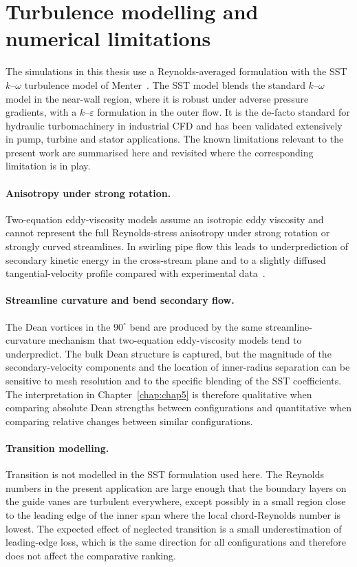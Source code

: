 \section{Turbulence modelling and numerical limitations}
\label{sec:theory_turbulence}
 
The simulations in this thesis use a Reynolds-averaged formulation with the SST $k$--$\omega$ turbulence model of Menter~\cite{Menter1994}. The SST model blends the standard $k$--$\omega$ model in the near-wall region, where it is robust under adverse pressure gradients, with a $k$--$\varepsilon$ formulation in the outer flow. It is the de-facto standard for hydraulic turbomachinery in industrial CFD and has been validated extensively in pump, turbine and stator applications. The known limitations relevant to the present work are summarised here and revisited where the corresponding limitation is in play.
 
\paragraph{Anisotropy under strong rotation.} Two-equation eddy-viscosity models assume an isotropic eddy viscosity and cannot represent the full Reynolds-stress anisotropy under strong rotation or strongly curved streamlines. In swirling pipe flow this leads to underprediction of secondary kinetic energy in the cross-stream plane and to a slightly diffused tangential-velocity profile compared with experimental data~\cite{EscueCui2010}.
 
\paragraph{Streamline curvature and bend secondary flow.} The Dean vortices in the $90^\circ$ bend are produced by the same streamline-curvature mechanism that two-equation eddy-viscosity models tend to underpredict. The bulk Dean structure is captured, but the magnitude of the secondary-velocity components and the location of inner-radius separation can be sensitive to mesh resolution and to the specific blending of the SST coefficients. The interpretation in Chapter~\ref{chap:chap5} is therefore qualitative when comparing absolute Dean strengths between configurations and quantitative when comparing relative changes between similar configurations.
 
\paragraph{Transition modelling.} Transition is not modelled in the SST formulation used here. The Reynolds numbers in the present application are large enough that the boundary layers on the guide vanes are turbulent everywhere, except possibly in a small region close to the leading edge of the inner span where the local chord-Reynolds number is lowest. The expected effect of neglected transition is a small underestimation of leading-edge loss, which is the same direction for all configurations and therefore does not affect the comparative ranking.
 
